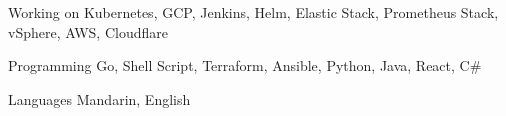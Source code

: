 

\begin{cvskills}

  \cvskill
    {Working on} %
    {Kubernetes, GCP, Jenkins, Helm, Elastic Stack, Prometheus Stack, vSphere, AWS, Cloudflare} %

  \cvskill
    {Programming} %
    {Go, Shell Script, Terraform, Ansible, Python, Java, React, C\#} %

  \cvskill
    {Languages} %
    {Mandarin, English} %

\end{cvskills}
